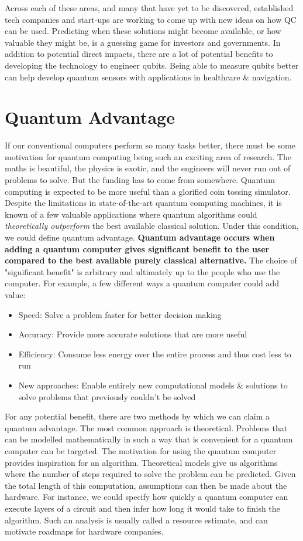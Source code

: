 Across each of these areas, and many that have yet to be discovered, established tech companies and start-ups are working to come up with new ideas on how QC can be used. Predicting when these solutions might become available, or how valuable they might be, is a guessing game for investors and governments. In addition to potential direct impacts, there are a lot of potential benefits to developing the technology to engineer qubits. Being able to measure qubits better can help develop quantum sensors with applications in healthcare \& navigation. 

\section{Quantum Advantage} 

If our conventional computers perform so many tasks better, there must be some motivation for quantum computing being such an exciting area of research. The maths is beautiful, the physics is exotic, and the engineers will never run out of problems to solve. But the funding has to come from somewhere. Quantum computing is expected to be more useful than a glorified coin tossing simulator. Despite the limitations in state-of-the-art quantum computing machines, it is known of a few valuable applications where quantum algorithms could \textit{theoretically outperform} the best available classical solution. Under this condition, we could define quantum advantage. \textbf{Quantum advantage occurs when adding a quantum computer gives significant benefit to the user compared to the best available purely classical alternative.} The choice of "significant benefit" is arbitrary and ultimately up to the people who use the computer. For example, a few different ways a quantum computer could add value: 

\begin{itemize}
    \item Speed: Solve a problem faster for better decision making
    \item Accuracy: Provide more accurate solutions that are more useful 
    \item Efficiency: Consume less energy over the entire process and thus cost less to run 
    \item New approaches: Enable entirely new computational models \& solutions to solve problems that previously couldn't be solved
\end{itemize}

For any potential benefit, there are two methods by which we can claim a quantum advantage. The most common approach is theoretical. Problems that can be modelled mathematically in such a way that is convenient for a quantum computer can be targeted. The motivation for using the quantum computer provides inspiration for an algorithm. Theoretical models give us algorithms where the number of steps required to solve the problem can be predicted. Given the total length of this computation, assumptions can then be made about the hardware. For instance, we could specify how quickly a quantum computer can execute layers of a circuit and then infer how long it would take to finish the algorithm. Such an analysis is usually called a resource estimate, and can motivate roadmaps for hardware companies. 

